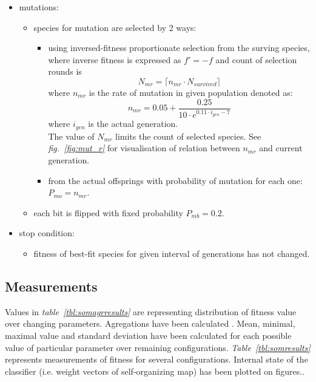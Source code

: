 \documentclass[a4paper]{IEEEtran}
\begin{document}
\begin{itemize}
	\item mutations:
	\begin{itemize}
		\item species for mutation are selected by 2 ways:
		\begin{itemize}
			\item using inversed-fitness proportionate
			selection from the surving species, where inverse fitness is expressed as
			$ f'=-f  $
			and count of selection rounds is
			\[ N_{mr} = \lceil n_{mr}\cdot N_{survived} \rceil \]
			where 
			$ n_{mr} $  is the rate of mutation in given population denoted as:			
			\[ n_{mr} = 0.05+\dfrac{0.25}{10\cdot e^{0.11\cdot i_{gen}-7}}\]
			where
			$ i_{gen} $ is the actual generation.\\
			The value of $ N_{mr} $ limits the count of selected species. 
			See \textit{fig.~\ref{fig:mut_r}} for visualisation of relation between $ n_{mr} $ 
			and current generation.
			\item from the actual offsprings with probability of mutation for each one:
			$ P_{mo} = n_{mr} $.
		\end{itemize}
		\item each bit is flipped with fixed probability
		$ P_{mb} = 0.2 $.
	\end{itemize}
\end{itemize}
\begin{itemize}
	\item stop condition:
	\begin{itemize}
		\item fitness of best-fit species for given interval of generations has not changed.
	\end{itemize}	
\end{itemize}

\subsection{Measurements}
Values in \textit{table~\ref{tbl:somagrresults}} are representing distribution of fitness
 value over changing parameters.
Agregations have been calculated .
Mean, minimal, maximal value and standard deviation have been calculated
for each possible value of particular parameter over
remaining configurations. 
\textit{Table~\ref{tbl:somresults}} represents measurements of fitness for several configurations.
Internal state of the classifier (i.e. weight vectors of self-organizing map) 
has been plotted on figures.. %
\end{document}
